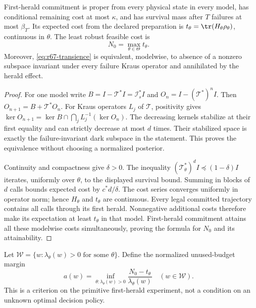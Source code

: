 \begin{lemma}\label{lem:r67-first-herald}
First-herald commitment is proper from every physical state in every model, has conditional remaining cost at most $\kappa$, and has survival mass after $T$ failures at most $\beta_T$. Its expected cost from the declared preparation is $t_\theta=\tr(H_\theta\rho_\theta)$, continuous in $\theta$. The least robust feasible cost is
\[
 N_0=\max_{\theta\in\Theta}t_\theta.
\]
Moreover, \eqref{eq:r67-transience} is equivalent, modelwise, to absence of a nonzero subspace invariant under every failure Kraus operator and annihilated by the herald effect.
\end{lemma}
\begin{proof}
For one model write $B=I-\mathcal T^*I=\mathcal I_s^*I$ and $O_n=I-(\mathcal T^*)^nI$. Then $O_{n+1}=B+\mathcal T^*O_n$. For Kraus operators $L_j$ of $\mathcal T$, positivity gives
$\ker O_{n+1}=\ker B\cap\bigcap_jL_j^{-1}(\ker O_n)$.
The decreasing kernels stabilize at their first equality and can strictly decrease at most $d$ times. Their stabilized space is exactly the failure-invariant dark subspace in the statement. This proves the equivalence without choosing a normalized posterior.

Continuity and compactness give $\delta>0$. The inequality $(\mathcal T_\theta^*)^dI\preccurlyeq(1-\delta)I$ iterates, uniformly over $\theta$, to the displayed survival bound. Summing in blocks of $d$ calls bounds expected cost by $c^*d/\delta$. The cost series converges uniformly in operator norm; hence $H_\theta$ and $t_\theta$ are continuous. Every legal committed trajectory contains all calls through its first herald. Nonnegative additional costs therefore make its expectation at least $t_\theta$ in that model. First-herald commitment attains all these modelwise costs simultaneously, proving the formula for $N_0$ and its attainability.
\end{proof}

Let $\mathcal W=\{w:\lambda_\theta(w)>0\text{ for some }\theta\}$. Define the normalized unused-budget margin
\begin{equation}\label{eq:r67-margin}
 a(w)=\inf_{\theta:\lambda_\theta(w)>0}
             \frac{N_0-t_\theta}{\lambda_\theta(w)}\quad(w\in\mathcal W).
\end{equation}
This is a criterion on the primitive first-herald experiment, not a condition on an unknown optimal decision policy.

